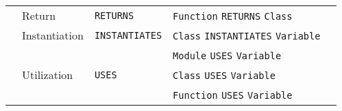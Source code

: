 \begin{tabularx}{\textwidth}{p{1.8cm}llXl}
\cmidrule{2-2}\cmidrule{3-3}\cmidrule{4-4}\cmidrule{5-5}
 & Return & \texttt{RETURNS} & \texttt{Function} \texttt{RETURNS} \texttt{Class} &  \\
\cmidrule{2-2}\cmidrule{3-3}\cmidrule{4-4}\cmidrule{5-5}
 & Instantiation & \texttt{INSTANTIATES} & \texttt{Class} \texttt{INSTANTIATES} \texttt{Variable} &  \\
\cmidrule{2-2}\cmidrule{3-3}\cmidrule{4-4}\cmidrule{5-5}
 & \multirow{3}[6]{*}{Utilization} & \multirow{3}[6]{*}{\texttt{USES}} & \texttt{Module} \texttt{USES} \texttt{Variable} &  \\
\cmidrule{4-4}\cmidrule{5-5}
 &  &  & \texttt{Class} \texttt{USES} \texttt{Variable} &  \\
\cmidrule{4-4}\cmidrule{5-5}
 &  &  & \texttt{Function} \texttt{USES} \texttt{Variable} &  \\
\bottomrule
\end{tabularx}

